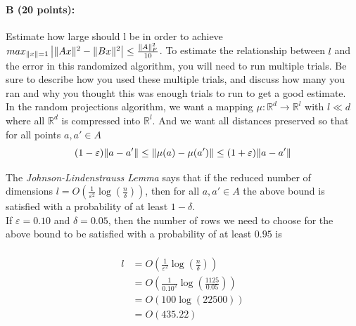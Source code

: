 \documentclass[11pt]{article}
\begin{document}
\paragraph{B (20 points):}

Estimate how large should l be in order to achieve $max_{\lVert x\rVert=1} \left | \lVert Ax\rVert^2 - \lVert Bx\rVert^2 \right | \leq \frac{\lVert A\rVert_F^2}{10}$. To estimate the relationship between $l$ and the error in this randomized algorithm, you will need to run multiple trials. Be sure to describe how you used these multiple trials, and discuss how many you ran and why you thought this was enough trials to run to get a good estimate.\\

In the random projections algorithm, we want a mapping $\mu : \mathbb{R}^d \rightarrow \mathbb{R}^l$ with $l \ll d$ where all $\mathbb{R}^d$ is compressed into $\mathbb{R}^l$. And we want all distances preserved so that for all points $a, a' \in A$
$$
(1-\varepsilon)\lVert a-a'\rVert \leq \lVert\mu(a)-\mu(a')\rVert \leq (1+\varepsilon)\lVert a-a'\rVert
$$

The \textit{Johnson-Lindenstrauss Lemma} says that if the reduced number of dimensions $l=O\left ( \frac{1}{\varepsilon^2} \log \left (\frac{n}{\delta} \right ) \right )$, then for all $a, a' \in A$ the above bound is satisfied with a probability of at least $1-\delta$.\\

If $\varepsilon=0.10$ and $\delta=0.05$, then the number of rows we need to choose for the above bound to be satisfied with a probability of at least $0.95$ is

\begin{equation*}
\begin{aligned}\\
l&=O\left ( \frac{1}{\varepsilon^2} \log \left (\frac{n}{\delta} \right ) \right )\\
&= O\left ( \frac{1}{0.10^2} \log \left (\frac{1125}{0.05} \right ) \right )\\
&= O\left ( 100 \log \left (22500 \right ) \right )\\
&= O\left ( 435.22 \right )
\end{aligned}
\end{equation*}
\end{document}
